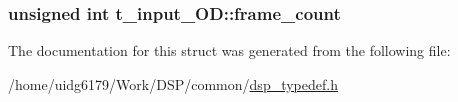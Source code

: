 \subsubsection[{\texorpdfstring{frame\+\_\+count}{frame_count}}]{\setlength{\rightskip}{0pt plus 5cm}unsigned int t\+\_\+input\+\_\+\+O\+D\+::frame\+\_\+count}\hypertarget{structt__input__OD_a47c7f66e3f1c0151e83a6606ad303fb9}{}\label{structt__input__OD_a47c7f66e3f1c0151e83a6606ad303fb9}


The documentation for this struct was generated from the following file\+:\begin{DoxyCompactItemize}
\item 
/home/uidg6179/\+Work/\+D\+S\+P/common/\hyperlink{dsp__typedef_8h}{dsp\+\_\+typedef.\+h}\end{DoxyCompactItemize}
